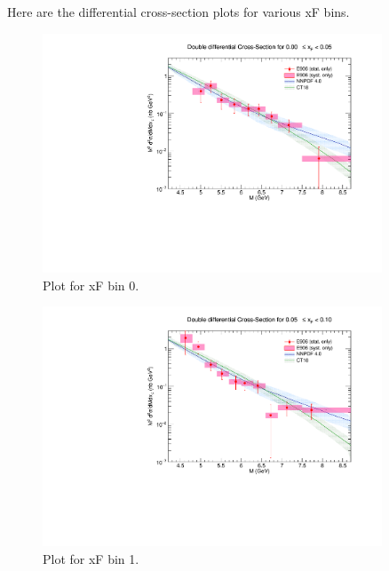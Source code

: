 Here are the differential cross-section plots for various xF bins.

\begin{figure}[p] %
\centering
\includegraphics[width=0.9\textwidth]{./XSecPlots/LH2_0_roofit.pdf}
\caption{Plot for xF bin 0.}
\end{figure}
\clearpage

\begin{figure}[p]
\centering
\includegraphics[width=0.9\textwidth]{./XSecPlots/LH2_1_roofit.pdf}
\caption{Plot for xF bin 1.}
\end{figure}
\clearpage

